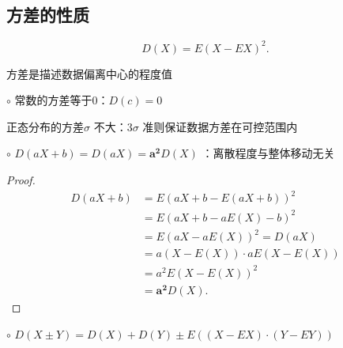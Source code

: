 \subsection{方差的性质}%
\label{sub:方差的性质}
\[
    D\left( X \right) =E\left( X-EX \right) ^2
.\] 
\begin{notation}
    方差是描述数据偏离中心的程度值
\end{notation}
$\circ$ 常数的方差等于0：$D\left( c \right) =0$
\begin{notation}
    正态分布的方差$\sigma$ 不大：$3\sigma$ 准则保证数据方差在可控范围内
\end{notation}
$\circ$ $D\left( aX+b \right) =D\left( aX \right)=\bm{a^2}D\left( X \right)  $ ：离散程度与整体移动无关
\begin{proof}
    \begin{align*}
        D\left( aX+b \right) &= E\left( aX+b-E\left( aX+b \right)  \right) ^2 \\
        &= E\left( aX+b-aE\left( X \right) -b \right) ^2 \\
        &= E\left( aX-aE\left( X \right)  \right) ^2 =D\left( aX \right) \\
        &= a\left( X-E\left( X \right)  \right) \cdot aE\left( X-E\left( X \right)  \right)  \\
        &= a^2E\left( X-E(X) \right)^2 \\
        &= \bm{a^2}D\left( X \right) 
    .\end{align*}
\end{proof}
$\circ$ $D\left( X\pm Y \right) =D\left( X \right) +D\left( Y \right) \pm E\left( \left( X-EX \right) \cdot \left( Y-EY \right)  \right) $
